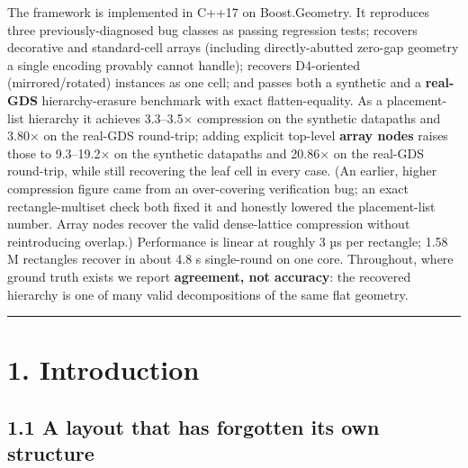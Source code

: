 \documentclass[
  11pt,
]{article}
\begin{document}
The framework is implemented in C++17 on Boost.Geometry. It reproduces
three previously-diagnosed bug classes as passing regression tests;
recovers decorative and standard-cell arrays (including directly-abutted
zero-gap geometry a single encoding provably cannot handle); recovers
D4-oriented (mirrored/rotated) instances as one cell; and passes both a
synthetic and a \textbf{real-GDS} hierarchy-erasure benchmark with exact
flatten-equality. As a placement-list hierarchy it achieves 3.3--3.5×
compression on the synthetic datapaths and 3.80× on the real-GDS
round-trip; adding explicit top-level \textbf{array nodes} raises those
to 9.3--19.2× on the synthetic datapaths and 20.86× on the real-GDS
round-trip, while still recovering the leaf cell in every case. (An
earlier, higher compression figure came from an over-covering
verification bug; an exact rectangle-multiset check both fixed it and
honestly lowered the placement-list number. Array nodes recover the
valid dense-lattice compression without reintroducing overlap.)
Performance is linear at roughly 3 µs per rectangle; 1.58 M rectangles
recover in about 4.8 s single-round on one core. Throughout, where
ground truth exists we report \textbf{agreement, not accuracy}: the
recovered hierarchy is one of many valid decompositions of the same flat
geometry.

\begin{center}\rule{0.5\linewidth}{0.5pt}\end{center}

\section{1. Introduction}\label{introduction}

\subsection{1.1 A layout that has forgotten its own
structure}\label{a-layout-that-has-forgotten-its-own-structure}
\end{document}
